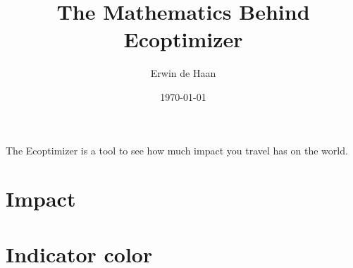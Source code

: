 \documentclass[final,a4paper,11pt]{article}
\author{Erwin de Haan}
\title{The Mathematics Behind Ecoptimizer}
\date{\today}
\begin{document}
\maketitle
The Ecoptimizer is a tool to see how much impact you travel has on the world.
\section{Impact}

\section{Indicator color}
\end{document}
